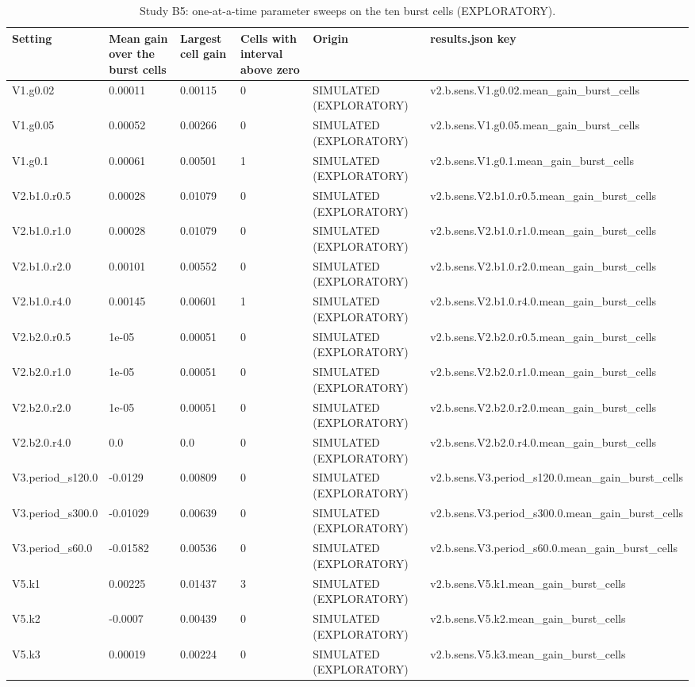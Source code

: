 \begin{table}[t]
\centering
\small
\caption{Study B5: one-at-a-time parameter sweeps on the ten burst cells (EXPLORATORY).}
\label{tab:v2_tab_sensitivity}
\begin{tabular}{llllll}
\toprule
Setting & Mean gain over the burst cells & Largest cell gain & Cells with interval above zero & Origin & results.json key \\
\midrule
V1.g0.02 & 0.00011 & 0.00115 & 0 & SIMULATED (EXPLORATORY) & v2.b.sens.V1.g0.02.mean\_gain\_burst\_cells \\
V1.g0.05 & 0.00052 & 0.00266 & 0 & SIMULATED (EXPLORATORY) & v2.b.sens.V1.g0.05.mean\_gain\_burst\_cells \\
V1.g0.1 & 0.00061 & 0.00501 & 1 & SIMULATED (EXPLORATORY) & v2.b.sens.V1.g0.1.mean\_gain\_burst\_cells \\
V2.b1.0.r0.5 & 0.00028 & 0.01079 & 0 & SIMULATED (EXPLORATORY) & v2.b.sens.V2.b1.0.r0.5.mean\_gain\_burst\_cells \\
V2.b1.0.r1.0 & 0.00028 & 0.01079 & 0 & SIMULATED (EXPLORATORY) & v2.b.sens.V2.b1.0.r1.0.mean\_gain\_burst\_cells \\
V2.b1.0.r2.0 & 0.00101 & 0.00552 & 0 & SIMULATED (EXPLORATORY) & v2.b.sens.V2.b1.0.r2.0.mean\_gain\_burst\_cells \\
V2.b1.0.r4.0 & 0.00145 & 0.00601 & 1 & SIMULATED (EXPLORATORY) & v2.b.sens.V2.b1.0.r4.0.mean\_gain\_burst\_cells \\
V2.b2.0.r0.5 & 1e-05 & 0.00051 & 0 & SIMULATED (EXPLORATORY) & v2.b.sens.V2.b2.0.r0.5.mean\_gain\_burst\_cells \\
V2.b2.0.r1.0 & 1e-05 & 0.00051 & 0 & SIMULATED (EXPLORATORY) & v2.b.sens.V2.b2.0.r1.0.mean\_gain\_burst\_cells \\
V2.b2.0.r2.0 & 1e-05 & 0.00051 & 0 & SIMULATED (EXPLORATORY) & v2.b.sens.V2.b2.0.r2.0.mean\_gain\_burst\_cells \\
V2.b2.0.r4.0 & 0.0 & 0.0 & 0 & SIMULATED (EXPLORATORY) & v2.b.sens.V2.b2.0.r4.0.mean\_gain\_burst\_cells \\
V3.period\_s120.0 & -0.0129 & 0.00809 & 0 & SIMULATED (EXPLORATORY) & v2.b.sens.V3.period\_s120.0.mean\_gain\_burst\_cells \\
V3.period\_s300.0 & -0.01029 & 0.00639 & 0 & SIMULATED (EXPLORATORY) & v2.b.sens.V3.period\_s300.0.mean\_gain\_burst\_cells \\
V3.period\_s60.0 & -0.01582 & 0.00536 & 0 & SIMULATED (EXPLORATORY) & v2.b.sens.V3.period\_s60.0.mean\_gain\_burst\_cells \\
V5.k1 & 0.00225 & 0.01437 & 3 & SIMULATED (EXPLORATORY) & v2.b.sens.V5.k1.mean\_gain\_burst\_cells \\
V5.k2 & -0.0007 & 0.00439 & 0 & SIMULATED (EXPLORATORY) & v2.b.sens.V5.k2.mean\_gain\_burst\_cells \\
V5.k3 & 0.00019 & 0.00224 & 0 & SIMULATED (EXPLORATORY) & v2.b.sens.V5.k3.mean\_gain\_burst\_cells \\
\bottomrule
\end{tabular}
\end{table}
